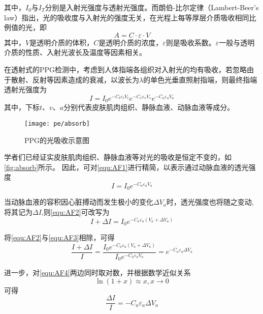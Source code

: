 其中，$I_{0}$与$I_{T}$分别是入射光强度与透射光强度。而朗伯-比尔定律（Lambert-Beer's law）指出，光的吸收度与入射光的强度无关，在光程上每等厚层介质吸收相同比例值的光，即
\begin{equation}
    \label{equ:LBL2}
    A=C \cdot \varepsilon \cdot V
\end{equation}
其中，$V$是透明介质的体积，$C$是透明介质的浓度，$\varepsilon$则是吸收系数。$\varepsilon$一般与透明介质的性质、入射光波长及温度等因素相关。

在透射式的PPG检测中，考虑到人体指端各组织对入射光的均有吸收，若忽略由于散射、反射等因素造成的衰减，以波长为$\lambda$的单色光垂直照射指端，则最终指端透射光强度为\cite{4122392}
\begin{equation}
    \label{equ:AF1}
    I=I_{0}e^{-C_{t}\varepsilon _{t}V_{t}}e^{-C_{v}\varepsilon _{v}V_{v}} e^{-C_{a}\varepsilon _{a}V_{a}} 
\end{equation}
其中，下标$t$、$v$、$a$分别代表皮肤肌肉组织、静脉血液、动脉血液等成分。

\begin{figure}[htbp]
    \centering
    \texttt{[image: pe/absorb]}
    \caption{\label{fig:absorb}PPG的光吸收示意图}
\end{figure}

学者们已经证实皮肤肌肉组织、静脉血液等对光的吸收是恒定不变的\cite{1980Spectrophotometric,4122392}，如\autoref{fig:absorb}所示。
因此，可对\autoref{equ:AF1}进行精简，以表示通过动脉血液的透光强度\cite{PPGYY}
\begin{equation}
    \label{equ:AF2}
    I=I_{0}e^{-C_{a}\varepsilon _{a}V_{a}} 
\end{equation}

当动脉血液的容积因心脏搏动而发生极小的变化$\Delta V_{a}$时，透光强度也将随之变动,将其记为$\Delta I$,则\autoref{equ:AF2}可改写为
\begin{equation}
    \label{equ:AF3}
    I+\Delta I=I_{0}e^{-C_{a}\varepsilon _{a}(V_{a}+\Delta V_{a})} 
\end{equation}

将\autoref{equ:AF2}与\autoref{equ:AF3}相除，可得
\begin{equation}
    \label{equ:AF4}
    \frac{I+\Delta I}{I}=\frac{I_{0}e^{-C_{a}\varepsilon _{a}(V_{a}+\Delta V_{a})}}{I_{0}e^{-C_{a}\varepsilon _{a}V_{a}}}=e^{-C_{a}\varepsilon _{a}\Delta V_{a}} 
\end{equation}

进一步，对\autoref{equ:AF4}两边同时取对数，并根据数学近似关系
\begin{equation}
    \label{equ:lnx}
    \ln(1+x)\approx x,x\rightarrow 0
\end{equation}
可得
\begin{equation}
    \label{equ:AF5}
    \frac{\Delta I}{I}=-C_{a}\varepsilon _{a}\Delta V_{a}
\end{equation}

